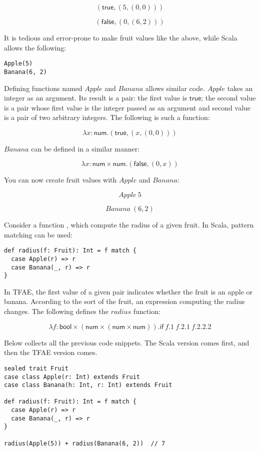 \[(\textsf{true},(5,(0,0)))\]

\[(\textsf{false},(0,(6,2)))\]

It is tedious and error-prone to make fruit values like the above, while Scala
allows the following:

\begin{verbatim}
Apple(5)
Banana(6, 2)
\end{verbatim}

Defining functions named $Apple$ and $Banana$ allows similar code. $Apple$
takes an integer as an argument. Its result is a pair: the first value is
\(\textsf{
true}\); the second value is a pair whose first value is the integer passed as
an argument and second value is a pair of two arbitrary integers. The following
is such a function:

\[\lambda x:\textsf{num}.(\textsf{true},(x,(0,0)))\]

$Banana$ can be defined in a similar manner:

\[\lambda x:\textsf{num}\times\textsf{num}.(\textsf{false},(0,x))\]

You can now create fruit values with $Apple$ and $Banana$:

\[Apple\ 5\]

\[Banana\ (6,2)\]

Consider a function , which compute the radius of a given fruit. In
Scala, pattern matching can be used:

\begin{verbatim}
def radius(f: Fruit): Int = f match {
  case Apple(r) => r
  case Banana(_, r) => r
}
\end{verbatim}

In TFAE, the first value of a given pair indicates whether the fruit is an apple
or banana. According to the sort of the fruit, an expression computing the
radius changes. The following defines the $radius$ function:

\[\lambda
f:\textsf{bool}\times(\textsf{num}\times(\textsf{num}\times\textsf{num})).
\textsf{if}\ f.1\ f.2.1\ f.2.2.2\]

Below collects all the previous code snippets. The Scala version comes first,
and then the TFAE version comes.

\begin{verbatim}
sealed trait Fruit
case class Apple(r: Int) extends Fruit
case class Banana(h: Int, r: Int) extends Fruit

def radius(f: Fruit): Int = f match {
  case Apple(r) => r
  case Banana(_, r) => r
}

radius(Apple(5)) + radius(Banana(6, 2))  // 7
\end{verbatim}

